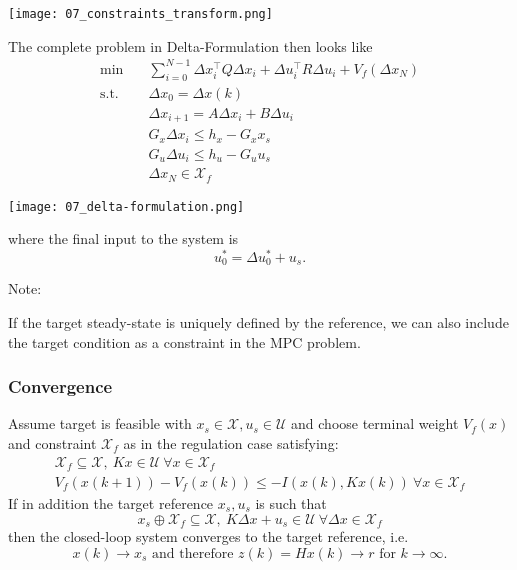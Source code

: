 \begin{center}
    \texttt{[image: 07\_constraints\_transform.png]}
\end{center}

The complete problem in Delta-Formulation then looks like
\begin{align*}
    \min \quad        & \sum_{i=0}^{N-1} \Delta x_i^\top Q \Delta x_i + \Delta u_i^\top R \Delta u_i + V_f(\Delta x_N) \\
    \text{s.t.} \quad & \Delta x_0 = \Delta x(k)                                                                       \\
                      & \Delta x_{i+1} = A \Delta x_i + B \Delta u_i                                                   \\
                      & G_x \Delta x_i \leq h_x - G_x x_s                                                              \\
                      & G_u \Delta u_i \leq h_u - G_u u_s                                                              \\
                      & \Delta x_N \in \mathcal{X}_f
\end{align*}

\begin{center}
    \texttt{[image: 07\_delta-formulation.png]}
\end{center}

where the final input to the system is
\begin{equation*}
    u_0^* = \Delta u_0^* + u_s.
\end{equation*}

Note:

If the target steady-state is uniquely defined by the reference, we can also include the target condition as a constraint in the MPC problem.

\subsubsection{Convergence}

Assume target is feasible with $x_s \in \mathcal{X}, u_s \in \mathcal{U}$ and choose terminal weight $V_f(x)$ and constraint $\mathcal{X}_f$ as in the regulation case satisfying:
\begin{gather*}
    \mathcal{X}_f \subseteq \mathcal{X}, \: Kx \in \mathcal{U} \: \forall x \in \mathcal{X}_f \\
    V_f(x(k+1)) - V_f(x(k)) \leq -I(x(k),Kx(k)) \: \forall x \in \mathcal{X}_f
\end{gather*}
If in addition the target reference $x_s, u_s$ is such that
\begin{equation*}
    x_s \oplus \mathcal{X}_f \subseteq \mathcal{X}, \: K\Delta x + u_s \in \mathcal{U} \: \forall \Delta x \in \mathcal{X}_f
\end{equation*}
then the closed-loop system converges to the target reference, i.e.
\begin{equation*}
    x(k) \to x_s \text{ and therefore } z(k) = Hx(k) \to r \text{ for } k \to \infty.
\end{equation*}

